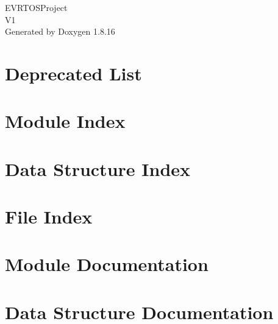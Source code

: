 \let\mypdfximage\pdfximage\def\pdfximage{\immediate\mypdfximage}\documentclass[twoside]{book}
\newcommand{\+}{\discretionary{\mbox{\scriptsize$\hookleftarrow$}}{}{}}
\newcommand{\clearemptydoublepage}{%
  \newpage{\pagestyle{empty}\cleardoublepage}%
}
\begin{document}
\hypersetup{pageanchor=false,
             bookmarksnumbered=true,
             pdfencoding=unicode
            }
\begin{titlepage}
\vspace*{7cm}
\begin{center}%
{\Large E\+V\+R\+T\+O\+S\+Project \\[1ex]\large V1 }\\
\vspace*{1cm}
{\large Generated by Doxygen 1.8.16}\\
\end{center}
\end{titlepage}
\clearemptydoublepage
{}
\tableofcontents
\clearemptydoublepage
{}
\hypersetup{pageanchor=true}

\chapter{Deprecated List}
\label{deprecated}

\chapter{Module Index}

\chapter{Data Structure Index}

\chapter{File Index}

\chapter{Module Documentation}









\chapter{Data Structure Documentation}


















\end{document}
